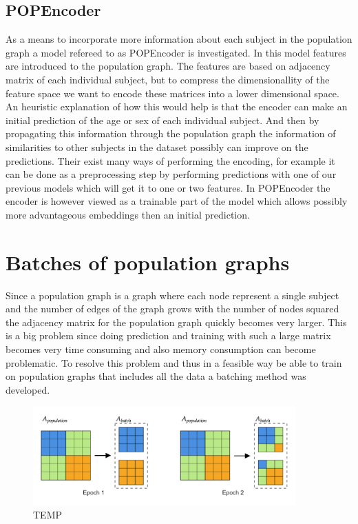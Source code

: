 \subsection{POPEncoder}
As a means to incorporate more information about each subject in the population graph a model refereed to as POPEncoder is investigated. In this model features are introduced to the population graph. The features are based on adjacency matrix of each individual subject, but to compress the dimensionallity of the feature space we want to encode these matrices into a lower dimensional space. An heuristic explanation of how this would help is that the encoder can make an initial prediction of the age or sex of each individual subject. And then by propagating this information through the population graph the information of similarities to other subjects in the dataset possibly can improve on the predictions. Their exist many ways of performing the encoding, for example it can be done as a preprocessing step by performing predictions with one of our previous models which will get it to one or two features. In POPEncoder the encoder is however viewed as a trainable part of the model which allows possibly more advantageous embeddings then an initial prediction. 


\section{Batches of population graphs}
Since a population graph is a graph where each node represent a single subject and the number of edges of the graph grows with the number of nodes squared the adjacency matrix for the population graph quickly becomes very larger. This is a big problem since doing prediction and training with such a large matrix becomes very time consuming and also memory consumption can become problematic. To resolve this problem and thus in a feasible way be able to train on population graphs that includes all the data a batching method was developed. 

\begin{figure}[H]
    \centering
    \includegraphics[width=0.9\textwidth]{chapters/images_methods/batches.png}
    \caption{TEMP}
    \label{fig:batches}
\end{figure}

